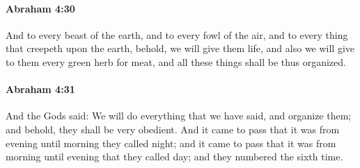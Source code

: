 
		\paragraph{Abraham 4:30} %
			\label{ABRAHAM-4-30}

			And to every beast of the earth, and to every fowl of the air, and to every thing that creepeth upon the earth, behold, we will give them life, and also we will give to them every green herb for meat, and all these things shall be thus organized.


		\paragraph{Abraham 4:31} %
			\label{ABRAHAM-4-31}

			And the Gods said: We will do everything that we have said, and organize them; and behold, they shall be very obedient.  And it came to pass that it was from evening until morning they called night; and it came to pass that it was from morning until evening that they called day; and they numbered the sixth time.

